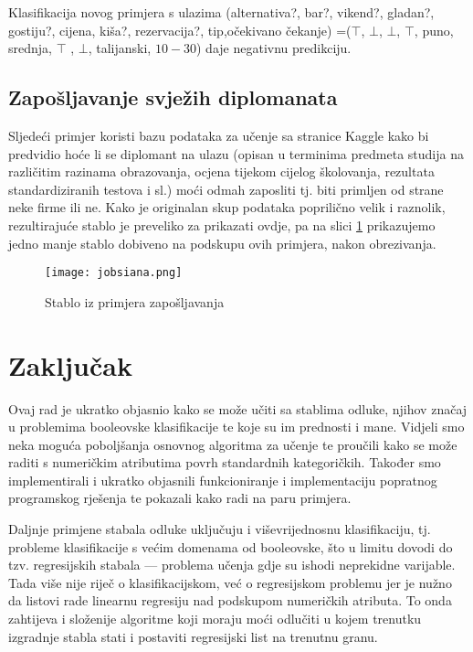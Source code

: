 \documentclass[12pt,a4paper]{article}
\begin{document}
    Klasifikacija novog primjera s ulazima (alternativa?, bar?, vikend?, gladan?, gostiju?, cijena, kiša?, rezervacija?, tip,očekivano čekanje)
    =($\top$, $\bot$, $\bot$, $\top$, puno, srednja, $\top$ , $\bot$, talijanski, $10-30$) daje negativnu predikciju.

\subsection{Zapošljavanje svježih diplomanata}
Sljedeći primjer koristi bazu podataka za učenje sa stranice Kaggle \cite{kaggle} kako bi predvidio hoće li se diplomant na ulazu
(opisan u terminima predmeta studija na različitim razinama obrazovanja, ocjena tijekom cijelog školovanja, rezultata standardiziranih
testova i sl.) moći odmah zaposliti tj. biti primljen od strane neke firme ili ne. Kako je originalan skup podataka poprilično velik i
raznolik, rezultirajuće stablo je preveliko za prikazati ovdje, pa na slici \ref{jobs}
 prikazujemo jedno manje stablo dobiveno na podskupu ovih primjera,
nakon obrezivanja.

\begin{figure} \label{jobs}
    \texttt{[image: jobsiana.png]}
    \caption{Stablo iz primjera zapošljavanja}
    \end{figure}

\section{Zaključak}
Ovaj rad je ukratko objasnio kako se može učiti sa stablima odluke, njihov značaj u problemima
booleovske klasifikacije te koje su im prednosti i mane. Vidjeli smo neka
moguća poboljšanja osnovnog  algoritma za učenje te proučili kako se može raditi s numeričkim atributima povrh standardnih kategoričkih.
Također smo implementirali i ukratko objasnili funkcioniranje i implementaciju popratnog programskog rješenja te pokazali kako radi na paru primjera.

Daljnje primjene stabala odluke uključuju i viševrijednosnu klasifikaciju, tj. probleme klasifikacije s većim domenama od booleovske, što u limitu
dovodi do tzv. regresijskih stabala --- problema učenja gdje su ishodi neprekidne varijable. Tada više nije riječ o klasifikacijskom, već o
regresijskom problemu jer je nužno da listovi rade linearnu regresiju nad podskupom numeričkih atributa. To onda zahtijeva i složenije algoritme
koji moraju moći odlučiti u kojem trenutku izgradnje stabla stati i postaviti regresijski list na trenutnu granu.

\medskip
\printbibliography
\end{document}
